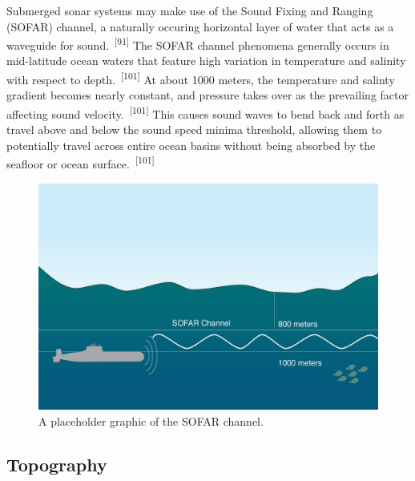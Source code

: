 \documentclass{article}
\begin{document}

\par{Submerged sonar systems may make use of the Sound Fixing and Ranging (SOFAR) channel, a naturally occuring horizontal layer of water that acts as a waveguide for sound.~\textsuperscript{[91]} The SOFAR channel phenomena generally occurs in mid-latitude ocean waters that feature high variation in temperature and salinity with respect to depth.~\textsuperscript{[101]} At about 1000 meters, the temperature and salinty gradient becomes nearly constant, and pressure takes over as the prevailing factor affecting sound velocity.~\textsuperscript{[101]} This causes sound waves to bend back and forth as travel above and below the sound speed minima threshold, allowing them to potentially travel across entire ocean basins without being absorbed by the seafloor or ocean surface.~\textsuperscript{[101]}}


\begin{figure}
    \centering
    \includegraphics[width=1.0\linewidth]{images/sofar.jpg}
    \caption{A placeholder graphic of the SOFAR channel.}
    \label{figure27}
\end{figure}

\subsection{Topography}


\par{}

\end{document}
